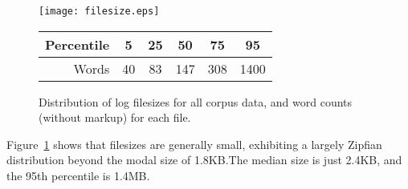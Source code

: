 \begin{figure}[h]
    \centering
    \texttt{[image: filesize.eps]}


    \begin{tabular}{ | r | c | c | c | c | c | }
        \hline
        Percentile & 5 & 25 & 50 & 75 & 95 \\ \hline
        Words & 40 & 83 & 147 & 308 & 1400 \\ \hline
    \end{tabular}

    \caption{Distribution of log filesizes for all corpus data, and word counts (without markup) for each file.}
    \label{fig:filesizes}
\end{figure}




Figure~\ref{fig:filesizes} shows that filesizes are generally small, exhibiting a largely Zipfian distribution beyond the modal size of 1.8KB.\@ The median size is just 2.4KB, and the 95th percentile is 1.4MB.





